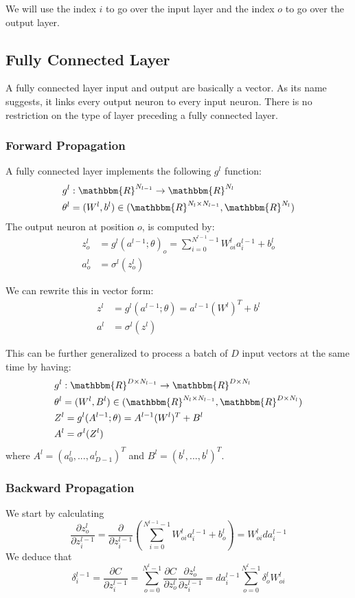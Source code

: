 \documentclass{article} %
\begin{document}
We will use the index $i$ to go over the input layer and the index $o$ to go over the output layer.

\subsection{Fully Connected Layer}
A fully connected layer input and output are basically a vector. As its name suggests, it links every output neuron to every input neuron. There is no restriction on the type of layer preceding a fully connected layer.

\subsubsection{Forward Propagation}
A fully connected layer implements the following $g^l$ function:
$$
\begin{aligned}
&g^l: \mathbbm{R}^{N_{l-1}} \rightarrow \mathbbm{R}^{N_l} \\
&\theta^l = (W^l, b^l) \in (\mathbbm{R}^{N_l \times N_{l-1}}, \mathbbm{R}^{N_l}) 
\end{aligned}
$$
The output neuron at position $o$, is computed by:
$$
\begin{aligned}
z^l_o &= g^l(a^{l-1}; \theta)_o = \sum_{i=0}^{N^{l-1}-1} W^l_{oi} a^{l-1}_i + b^l_o \\
a^l_o &= \sigma^l(z^l_o)
\end{aligned}
$$
 
We can rewrite this in vector form:
$$
\begin{aligned}
z^l &= g^l(a^{l-1}; \theta) = a^{l-1} (W^l)^T  + b^l \\
a^l &= \sigma^l(z^l)
\end{aligned}
$$

This can be further generalized to process a batch of $D$ input vectors at the same time by having:
$$
\begin{aligned}
&g^l: \mathbbm{R}^{D \times N_{l-1}} \rightarrow \mathbbm{R}^{D \times N_l} \\
&\theta^l = (W^l, B^l) \in (\mathbbm{R}^{N_l \times N_{l-1}}, \mathbbm{R}^{D \times N_l}) \\
&Z^l = g^l(A^{l-1}; \theta) = A^{l-1} (W^l)^T + B^l \\
&A^l = \sigma^l(Z^l)
\end{aligned}
$$
where $A^l = (a_0^l, ... , a_{D-1}^l)^T$ and $B^l = (b^l, ..., b^l)^T$.

\subsubsection{Backward Propagation}
We start by calculating
$$
\frac{\partial z^l_o}{\partial z^{l-1}_i} = \frac{\partial}{\partial z^{l-1}_i} \left( \sum_{i=0}^{N^{l-1}-1} W^l_{oi} a^{l-1}_i + b^l_o \right) = W^l_{oi} da_i^{l-1}
$$
We deduce that
$$
\delta^{l-1}_i 
= \frac{\partial C}{\partial z^{l-1}_i} = \sum_{o=0}^{N^l-1} \frac{\partial C}{\partial z^{l}_o} \frac{\partial z^l_o}{\partial z^{l-1}_i} = da_i^{l-1} \sum_{o=0}^{N^l-1} \delta^l_o W^l_{oi} 
$$
\end{document}
